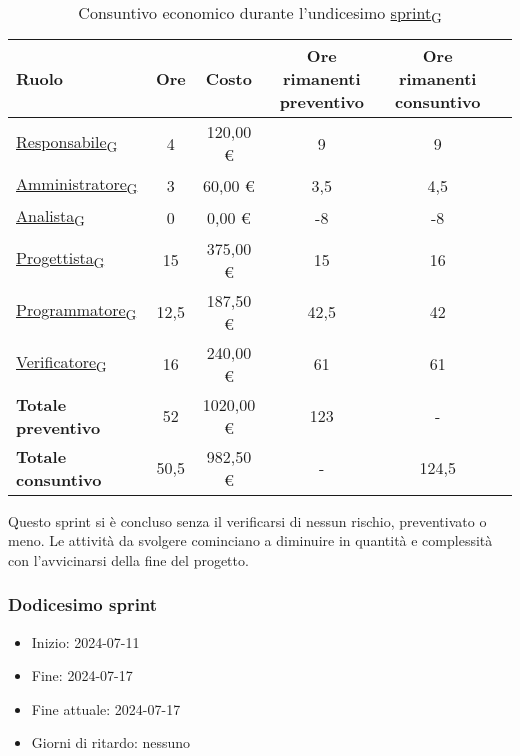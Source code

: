 \newpage
{}
\begin{table}[!h]
    \centering
    \begin{tabular}{ | l | c | c | c | c | c | }
        \hline
        \textbf{Ruolo} & \textbf{Ore} & \textbf{Costo} & \textbf{Ore rimanenti preventivo} & \textbf{Ore rimanenti consuntivo} \\
        \hline
        \href{https://7last.github.io/docs/rtb/documentazione-interna/glossario\#responsabile}{Responsabile\textsubscript{G}}     &  4   &  120,00 € &   9   &   9   \\
        \href{https://7last.github.io/docs/rtb/documentazione-interna/glossario\#amministratore}{Amministratore\textsubscript{G}} &  3   &   60,00 € &   3,5 &   4,5 \\
        \href{https://7last.github.io/docs/rtb/documentazione-interna/glossario\#analista}{Analista\textsubscript{G}}             &  0   &    0,00 € &  -8   &  -8   \\
        \href{https://7last.github.io/docs/rtb/documentazione-interna/glossario\#progettista}{Progettista\textsubscript{G}}       & 15   &  375,00 € &  15   &  16   \\
        \href{https://7last.github.io/docs/rtb/documentazione-interna/glossario\#programmatore}{Programmatore\textsubscript{G}}   & 12,5 &  187,50 € &  42,5 &  42   \\
        \href{https://7last.github.io/docs/rtb/documentazione-interna/glossario\#verificatore}{Verificatore\textsubscript{G}}     & 16   &  240,00 € &  61   &  61   \\
        \hline
        \textbf{Totale preventivo} & 52   & 1020,00 € & 123   &   -   \\
        \hline
        \textbf{Totale consuntivo} & 50,5 &  982,50 € &   -   & 124,5 \\
        \hline
    \end{tabular}
    \caption{Consuntivo economico durante l'undicesimo \href{https://7last.github.io/docs/rtb/documentazione-interna/glossario\#sprint}{sprint\textsubscript{G}}}
\end{table}

Questo sprint si è concluso senza il verificarsi di nessun rischio, preventivato o meno. Le attività da svolgere cominciano a diminuire in quantità e complessità con l'avvicinarsi della fine del progetto.



\newpage
\subsubsection{Dodicesimo sprint}
\begin{itemize}
    \item Inizio: 2024-07-11
    \item Fine: 2024-07-17
    \item Fine attuale: 2024-07-17
    \item Giorni di ritardo: nessuno
\end{itemize}


